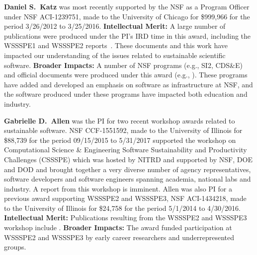 \documentclass[11pt]{article}
\begin{document}
\textbf{Daniel S.~Katz}
was most recently supported by the NSF as a Program Officer under NSF ACI-1239751, made to the University of Chicago for \$999,966 for the period 3/26/2012 to 3/25/2016.  {\bf Intellectual Merit:} A large number of publications were produced under the PI's IRD time in this award, including the WSSSPE1 and WSSSPE2 reports~\cite{WSSSPE1, WSSSPE2}. These documents and this work have impacted our understanding of the issues related to sustainable scientific software.  {\bf Broader Impacts:}
A number of NSF programs (e.g., SI2, CDS\&E) and official documents were produced under this award (e.g., \cite{NSF_software_vision}).  These programs have added and developed an emphasis on software as infrastructure at NSF, and the software produced under these programs have impacted both education and industry.

\textbf{Gabrielle D.~Allen}
was the PI for two recent workshop awards related to sustainable software. NSF CCF-1551592, made to the University of Illinois for \$88,739 for the period 09/15/2015 to 5/31/2017 supported the workshop on Computational Science \& Engineering Software Sustainability and Productivity Challenges (CSSSPE) which was hosted by NITRD and supported by NSF, DOE and DOD and brought together a very diverse number of agency representatives, software developers and software engineers spanning academia, national labs and industry. A report from this workshop is imminent. 
Allen was also PI for a previous award supporting WSSSPE2 and WSSSPE3, NSF ACI-1434218, made to the University of Illinois for \$24,758 for the period 5/1/2014 to 4/30/2016.  {\bf Intellectual Merit:} Publications  resulting from the WSSSPE2 and WSSSPE3 workshop include \cite{WSSSPE2-collection, WSSSPE2, WSSSPE3}. {\bf Broader Impacts:} The award funded participation at WSSSPE2 and WSSSPE3 by early career researchers and underrepresented groups.
\end{document}
